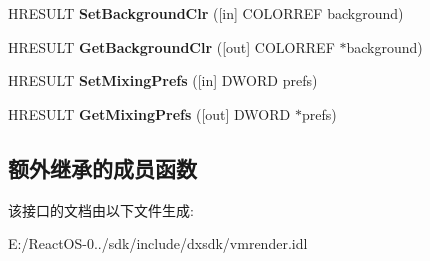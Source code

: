\begin{DoxyCompactItemize}
\item 
\mbox{\label{interface_i_v_m_r_mixer_control_a745cce8fb31191c341e172fa148d2cfa}} 
H\+R\+E\+S\+U\+LT {\bfseries Set\+Background\+Clr} (\mbox{[}in\mbox{]} C\+O\+L\+O\+R\+R\+EF background)
\item 
\mbox{\label{interface_i_v_m_r_mixer_control_a893f097a083f4fdebd4832380f5923fc}} 
H\+R\+E\+S\+U\+LT {\bfseries Get\+Background\+Clr} (\mbox{[}out\mbox{]} C\+O\+L\+O\+R\+R\+EF $\ast$background)
\item 
\mbox{\label{interface_i_v_m_r_mixer_control_a5f3a7a09ac4ffbb6cf141ac5cda86a11}} 
H\+R\+E\+S\+U\+LT {\bfseries Set\+Mixing\+Prefs} (\mbox{[}in\mbox{]} D\+W\+O\+RD prefs)
\item 
\mbox{\label{interface_i_v_m_r_mixer_control_a75d802bd55766f95f88847c2c92c9767}} 
H\+R\+E\+S\+U\+LT {\bfseries Get\+Mixing\+Prefs} (\mbox{[}out\mbox{]} D\+W\+O\+RD $\ast$prefs)
\end{DoxyCompactItemize}
\subsection*{额外继承的成员函数}


该接口的文档由以下文件生成\+:\begin{DoxyCompactItemize}
\item 
E\+:/\+React\+O\+S-\/0../sdk/include/dxsdk/vmrender.\+idl\end{DoxyCompactItemize}
